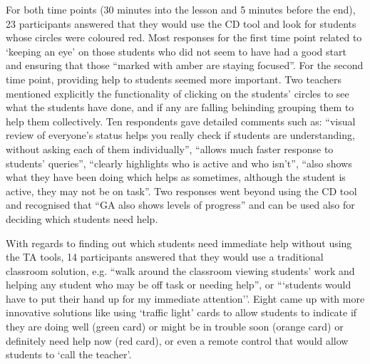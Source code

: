  
For both time points (30 minutes into the lesson and 5 minutes before
the end), 23 participants answered that they would use the
CD tool and look for students whose circles were coloured red. 
Most responses for the first time point
related to `keeping an eye' on those students 
who did not seem to have had a good start and
ensuring that those ``marked with amber are staying focused''.
For the second time point, providing help to students seemed more important.
Two teachers mentioned explicitly the
functionality of clicking on the students' circles to see what the students have
done, and if any are falling behinding grouping them to help them collectively. 
Ten respondents gave detailed comments such as: ``visual review of everyone's status
helps you really check if students are understanding, without asking
each of them individually'', ``allows much faster response to students' queries'', 
``clearly highlights who is active and who isn't'', 
``also shows what they have been doing which helps as sometimes,
although the student is active, they may not be on task''. 
Two responses went beyond using the CD tool and recognised
that ``GA also shows levels of progress'' and can be used also for
deciding which students need help. 
 
With regards to finding out which students need immediate help without
using the TA tools, 14 participants answered that they
would use a traditional classroom solution, e.g. ``walk around the
classroom viewing students' work and helping any student who may be
off task or needing help'', or ```students would have to put their hand up
for my immediate attention''. Eight came up with more innovative
solutions like using `traffic light' cards to allow students to indicate if
they are doing well (green card) or might be in trouble soon (orange
card) or definitely need help now (red card), or even a remote
control that would allow students to `call the teacher'. 

